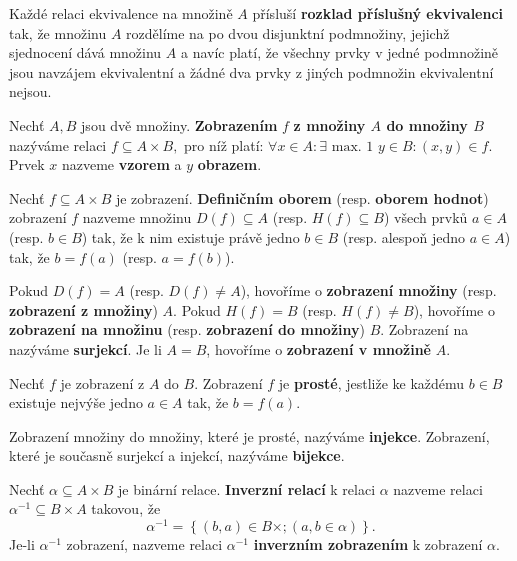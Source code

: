 \begin{pozn}
  Každé relaci ekvivalence na množině $A$ přísluší \textbf{rozklad příslušný ekvivalenci} tak, že množinu $A$ rozdělíme na po dvou disjunktní podmnožiny, jejichž sjednocení dává množinu $A$ a navíc platí, že všechny prvky v jedné podmnožině jsou navzájem ekvivalentní a žádné dva prvky z jiných podmnožin ekvivalentní nejsou.
\end{pozn}

\begin{definition}
  Nechť $A,B$ jsou dvě množiny. \textbf{Zobrazením} $f$ \textbf{z množiny $A$ do množiny $B$} nazýváme relaci $f\subseteq A \times B,$ pro níž platí: $\forall x \in A: \exists \text{ max. 1 } y \in B: (x,y) \in f$. Prvek $x$ nazveme \textbf{vzorem} a $y$ \textbf{obrazem}.
\end{definition}

\begin{definition}
  Nechť $f\subseteq A\times B$ je zobrazení. \textbf{Definičním oborem} (resp. \textbf{oborem hodnot}) zobrazení $f$ nazveme množinu $D(f)\subseteq A$ (resp. $H(f)\subseteq B$) všech prvků $a\in A$ (resp. $b\in B$) tak, že k nim existuje právě jedno $b\in B$ (resp. alespoň jedno $a\in A$) tak, že $b=f(a)$ (resp. $a=f(b)$).
\end{definition}

\begin{definition}
  Pokud $D(f) = A$ (resp. $D(f)\ne A$), hovoříme o \textbf{zobrazení množiny} (resp. \textbf{zobrazení z množiny}) $A$. Pokud $H(f)=B$ (resp. $H(f)\ne B$), hovoříme o \textbf{zobrazení na množinu} (resp. \textbf{zobrazení do množiny}) $B$.
  Zobrazení na nazýváme \textbf{surjekcí}. Je li $A=B$, hovoříme o \textbf{zobrazení v množině} $A$.
\end{definition}

\begin{definition}
  Nechť $f$ je zobrazení z $A$ do $B$. Zobrazení $f$ je \textbf{prosté}, jestliže ke každému $b\in B$ existuje nejvýše jedno $a \in A$ tak, že $b=f(a).$
\end{definition}

\begin{definition}
  Zobrazení množiny do množiny, které je prosté, nazýváme \textbf{injekce}. Zobrazení, které je současně surjekcí a injekcí, nazýváme \textbf{bijekce}.
\end{definition}

\begin{definition}
  Nechť $\alpha \subseteq A\times B$ je binární relace. \textbf{Inverzní relací} k relaci $\alpha$ nazveme relaci $\alpha^{-1} \subseteq B\times A$ takovou, že
  \[
    \alpha^{-1}=\left\{ (b,a)\in B\times ;  (a,b\in \alpha)\right\}.
  \]
  Je-li $\alpha^{-1}$ zobrazení, nazveme relaci $\alpha ^{-1}$ \textbf{inverzním zobrazením} k zobrazení $\alpha$.
\end{definition}

